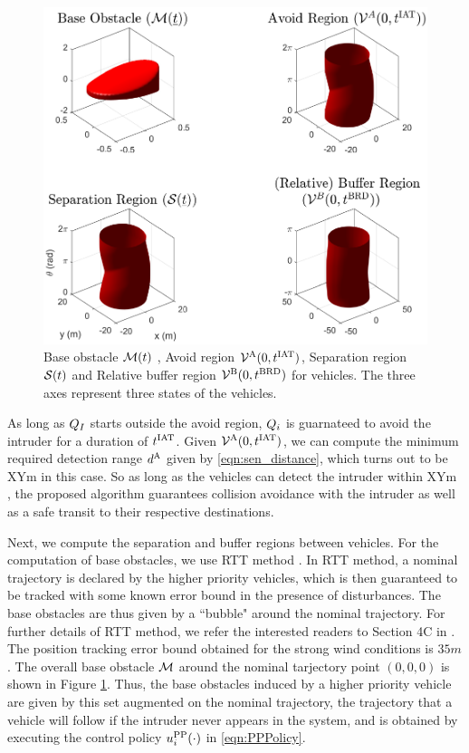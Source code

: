 \begin{figure}[H]
  \centering
  \includegraphics[width=\columnwidth]{"figs/bufferRegion_steps"}
  \caption{Base obstacle $\mathcal{M}(t)$ , Avoid region $\mathcal{V}^{\text{A}}(0, t^\text{IAT})$, Separation region $\mathcal{S}(t)$ and Relative buffer region $\mathcal{V}^{\text{B}}(0, t^\text{BRD})$ for vehicles. The three axes represent three states of the vehicles.}
  \label{fig:MaxMin}
\end{figure}
As long as $Q_{I}$ starts outside the avoid region, $Q_i$ is guarnateed to avoid the intruder for a duration of $t^\text{IAT}$. Given $\mathcal{V}^{\text{A}}(0, t^\text{IAT})$, we can compute the minimum required detection range $d^\text{A}$ given by \eqref{eqn:sen_distance}, which turns out to be XYm  in this case. So as long as the vehicles can detect the intruder within XYm , the proposed algorithm guarantees collision avoidance with the intruder as well as a safe transit to their respective destinations.   

Next, we compute the separation and buffer regions between vehicles. For the computation of base obstacles, we use RTT method \cite{Bansal2017}. In RTT method, a nominal trajectory is declared by the higher priority vehicles, which is then guaranteed to be tracked with some known error bound in the presence of disturbances. The base obstacles are thus given by a ``bubble" around the nominal trajectory. For further details of RTT method, we refer the interested readers to Section 4C in \cite{Bansal2017}. The position tracking error bound obtained for the strong wind conditions is $35m$ . The overall base obstacle $\mathcal{M}$ around the nominal tarjectory point $(0, 0, 0)$ is shown in Figure \ref{fig:MaxMin}. Thus, the base obstacles induced by a higher priority vehicle are given by this set augmented on the nominal trajectory, the trajectory that a vehicle will follow if the intruder never appears in the system, and is obtained by executing the control policy ${u^{\text{PP}}_{i}}(\cdot)$ in \eqref{eqn:PPPolicy}.

